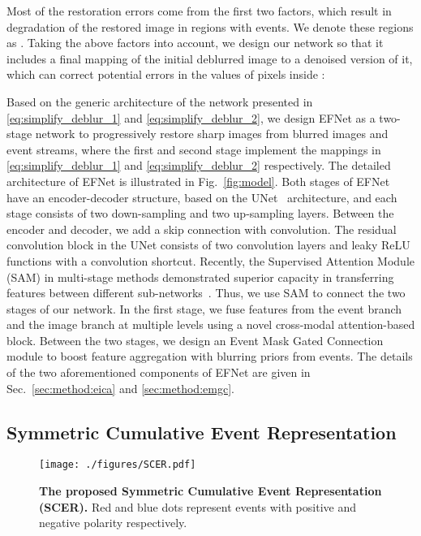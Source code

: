 \documentclass[runningheads]{llncs}
\newcommand{\PAR}[1]{\noindent{\bf #1}}
\newlength \g
\begin{document}
Most of the restoration errors come from the first two factors, which result in degradation of the restored image in regions with events. We denote these regions as .
Taking the above factors into account, we design our network so that it includes a final mapping  of the initial deblurred image  to a denoised version of it, which can correct potential errors in the values of pixels inside :




\PAR{Two-stage backbone.} Based on the generic architecture of the network presented in \eqref{eq:simplify_deblur_1} and \eqref{eq:simplify_deblur_2}, we design EFNet as a two-stage network to progressively restore sharp images from blurred images and event streams, where the first and second stage implement the mappings in \eqref{eq:simplify_deblur_1} and \eqref{eq:simplify_deblur_2} respectively. The detailed architecture of EFNet is illustrated in Fig.~\ref{fig:model}. Both stages of EFNet have an encoder-decoder structure, based on the UNet~\cite{ronneberger2015u} architecture, and each stage consists of two down-sampling and two up-sampling layers. Between the encoder and decoder, we add a skip connection with  convolution. The residual convolution block in the UNet consists of two  convolution layers and leaky ReLU functions with a  convolution shortcut. Recently, the Supervised Attention Module (SAM) in multi-stage methods demonstrated superior capacity in transferring features between different sub-networks~\cite{chen2021hinet,zamir2021multi}. Thus, we use SAM to connect the two stages of our network. In the first stage, we fuse features from the event branch and the image branch at multiple levels using a novel cross-modal attention-based block. Between the two stages, we design an Event Mask Gated Connection module to boost feature aggregation with blurring priors from events. The details of the two aforementioned components of EFNet are given in Sec.~\ref{sec:method:eica} and \ref{sec:method:emgc}.

\subsection{Symmetric Cumulative Event Representation}
\label{sec:method:event:representation}

\begin{wrapfigure}{l}{0.5\textwidth}
  \vspace{-30pt}
  \begin{center}
   \texttt{[image: ./figures/SCER.pdf]}
  \end{center}
  \vspace{-10pt}
\caption{\textbf{The proposed Symmetric Cumulative Event Representation (SCER).} Red and blue dots represent events with positive and negative polarity respectively. }
\vspace{-17pt}
  \label{fig:event_representation}
\end{wrapfigure}
\end{document}

